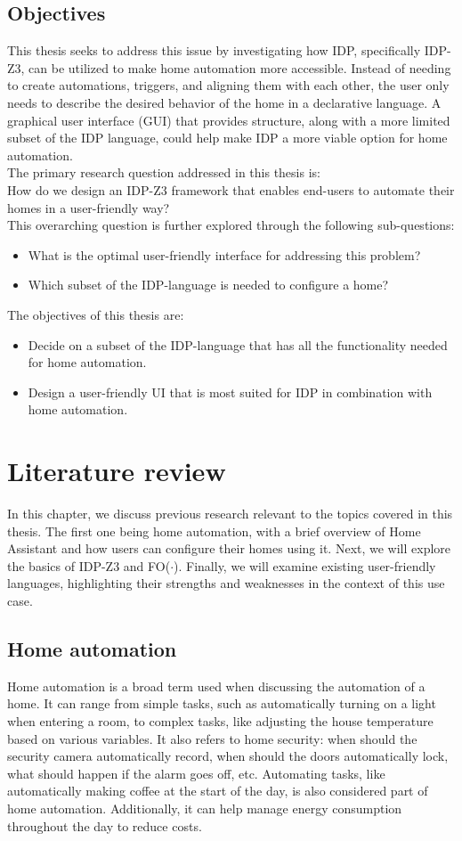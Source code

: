 \documentclass[11pt,a4paper]{report}
\newcommand{\fodot}{FO($\cdot$)\xspace}
\begin{document}
\section{Objectives}
This thesis seeks to address this issue by investigating how IDP, specifically IDP-Z3, can be utilized to make home automation more accessible. Instead of needing to create automations, triggers, and aligning them with each other, the user only needs to describe the desired behavior of the home in a declarative language. A graphical user interface (GUI) that provides structure, along with a more limited subset of the IDP language, could help make IDP a more viable option for home automation.\\
The primary research question addressed in this thesis is:\\
How do we design an IDP-Z3 framework that enables end-users to automate their homes in a user-friendly way?\\
This overarching question is further explored through the following sub-questions:
\begin{itemize}
    \item What is the optimal user-friendly interface for addressing this problem?
    \item Which subset of the IDP-language is needed to configure a home?
\end{itemize}
The objectives of this thesis are:
\begin{itemize}
    \item Decide on a subset of the IDP-language that has all the functionality needed for home automation.
    \item Design a user-friendly UI that is most suited for IDP in combination with home automation.
\end{itemize}


\newpage


\chapter{Literature review}
In this chapter, we discuss previous research relevant to the topics covered in this thesis. The first one being home automation, with a brief overview of Home Assistant and how users can configure their homes using it. Next, we will explore the basics of IDP-Z3 and \fodot. Finally, we will examine existing user-friendly languages, highlighting their strengths and weaknesses in the context of this use case.
\section{Home automation}
Home automation is a broad term used when discussing the automation of a home. It can range from simple tasks, such as automatically turning on a light when entering a room, to complex tasks, like adjusting the house temperature based on various variables. It also refers to home security: when should the security camera automatically record, when should the doors automatically lock, what should happen if the alarm goes off, etc. Automating tasks, like automatically making coffee at the start of the day, is also considered part of home automation. Additionally, it can help manage energy consumption throughout the day to reduce costs.
\end{document}
